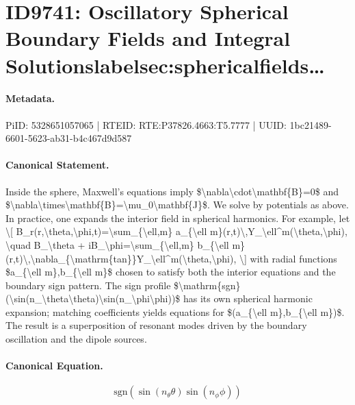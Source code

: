 \section*{ID9741: Oscillatory Spherical Boundary Fields and Integral Solutionslabelsec:sphericalfields…}
\paragraph{Metadata.}
PiID: 5328651057065 | RTEID: RTE:P37826.4663:T5.7777 | UUID: 1bc21489-6601-5623-ab31-b4c467d9d587

\paragraph{Canonical Statement.}
Inside the sphere, Maxwell's equations imply \$\textbackslash{}nabla\textbackslash{}cdot\textbackslash{}mathbf\{B\}=0\$ and \$\textbackslash{}nabla\textbackslash{}times\textbackslash{}mathbf\{B\}=\textbackslash{}mu\_0\textbackslash{}mathbf\{J\}\$. We solve by potentials as above. In practice, one expands the interior field in spherical harmonics. For example, let \textbackslash{}[ B\_r(r,\textbackslash{}theta,\textbackslash{}phi,t)=\textbackslash{}sum\_\{\textbackslash{}ell,m\} a\_\{\textbackslash{}ell m\}(r,t)\textbackslash{},Y\_\textbackslash{}ell\textasciicircum{}m(\textbackslash{}theta,\textbackslash{}phi), \textbackslash{}quad B\_\textbackslash{}theta + iB\_\textbackslash{}phi=\textbackslash{}sum\_\{\textbackslash{}ell,m\} b\_\{\textbackslash{}ell m\}(r,t)\textbackslash{},\textbackslash{}nabla\_\{\textbackslash{}mathrm\{tan\}\}Y\_\textbackslash{}ell\textasciicircum{}m(\textbackslash{}theta,\textbackslash{}phi), \textbackslash{}] with radial functions \$a\_\{\textbackslash{}ell m\},b\_\{\textbackslash{}ell m\}\$ chosen to satisfy both the interior equations and the boundary sign pattern. The sign profile \$\textbackslash{}mathrm\{sgn\}(\textbackslash{}sin(n\_\textbackslash{}theta\textbackslash{}theta)\textbackslash{}sin(n\_\textbackslash{}phi\textbackslash{}phi))\$ has its own spherical harmonic expansion; matching coefficients yields equations for \$(a\_\{\textbackslash{}ell m\},b\_\{\textbackslash{}ell m\})\$. The result is a superposition of resonant modes driven by the boundary oscillation and the dipole sources.

\paragraph{Canonical Equation.}
\[
\mathrm{sgn}(\sin(n_\theta\theta)\sin(n_\phi\phi))
\]

